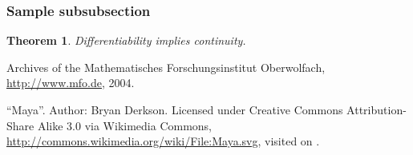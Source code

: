 \documentclass{snapshotmfo}
\begin{document}
\subsubsection{Sample subsubsection} \label{subsubsec:sample}

\newtheorem{theorem}{Theorem}
\begin{theorem}\label{thm:continuity}
	Differentiability implies continuity.
\end{theorem}



\begin{imagecredits}
	\item[\Cref{fig:Institute}] Archives of the Mathematisches Forschungsinstitut Oberwolfach,\\\url{http://www.mfo.de}, 2004.
	\item[\Cref{fig:maya}] ``Maya''. Author: Bryan Derkson. Licensed under Creative Commons Attribution-Share Alike 3.0 via Wikimedia Commons, \url{http://commons.wikimedia.org/wiki/File:Maya.svg}, visited on .
\end{imagecredits}
\end{document}

